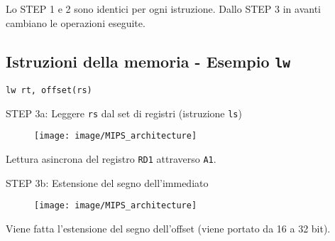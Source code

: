 \documentclass[../main.tex]{subfiles}
\begin{document}
    \vspace*{5mm}

    \noindent
    Lo STEP 1 e 2 sono identici per ogni istruzione.
    Dallo STEP 3 in avanti cambiano le operazioni eseguite.

    \newpage

    \subsection*{Istruzioni della memoria - Esempio \texttt{lw}}
    \texttt{lw rt, offset(rs)}
    \vspace*{1.5mm}

    \begin{adjustwidth}{1cm}{1cm}
        STEP 3a: Leggere \texttt{rs} dal set di registri (istruzione \texttt{ls}) \\

        \begin{figure}[h!]
            \vspace*{5mm}
            \hspace*{1cm} \texttt{[image: image/MIPS\_architecture]}
            \vspace*{5mm}
        \end{figure}

        \noindent
        Lettura asincrona del registro \texttt{RD1} attraverso \texttt{A1}.
    \end{adjustwidth}

    \vspace*{3mm}

    \begin{adjustwidth}{1cm}{1cm}
        STEP 3b: Estensione del segno dell'immediato \\

        \begin{figure}[h!]
            \centering

            \vspace*{5mm}
            \hspace*{1cm} \texttt{[image: image/MIPS\_architecture]}
            \vspace*{5mm}
        \end{figure}

        \noindent
        Viene fatta l'estensione del segno dell'offset (viene portato
        da 16 a 32 bit).
    \end{adjustwidth}

    \newpage
\end{document}
